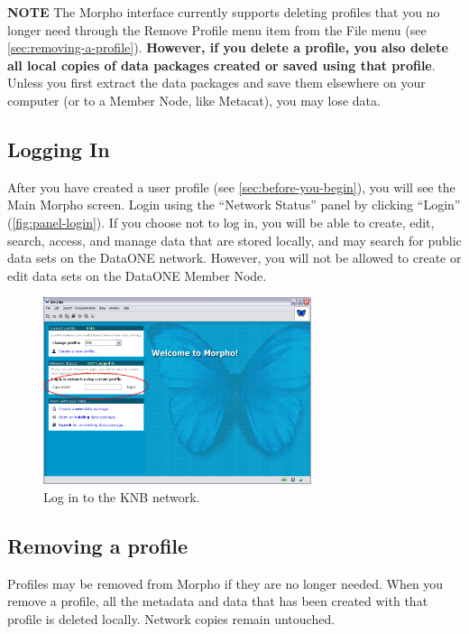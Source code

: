 \begin{shaded}
  \textbf{NOTE} The Morpho interface currently supports deleting
  profiles that you no longer need through the Remove Profile menu item
  from the File menu (see \autoref{sec:removing-a-profile}).
   \textbf{However, if you delete a profile, you also
  delete all local copies of data packages created or saved using that
  profile}. Unless you first extract the data packages and save them
  elsewhere on your computer (or to a Member Node, like Metacat), you
  may lose data.
\end{shaded}

\subsection{Logging In}

After you have created a user profile (see
\autoref{sec:before-you-begin}), you will see the Main Morpho screen.
Login using the ``Network Status'' panel by clicking
``Login'' (\autoref{fig:panel-login}). If you choose not to log in, you
will be able to create, edit, search, access, and manage data that are
stored locally, and may search for public data sets on the DataONE network.
However, you will not be allowed to create or edit data sets on the DataONE
Member Node.

\begin{figure}
  \centering
    \includegraphics[width=0.7\textwidth]{images/panel-login.jpg}
  \caption{Log in to the KNB network.}
  \label{fig:panel-login}
\end{figure}

\subsection{Removing a profile} \label{sec:removing-a-profile}

Profiles may be removed from Morpho if they are no longer needed.
When you remove a profile, all the metadata and data that has been created 
with that profile is deleted locally. Network copies remain untouched.

